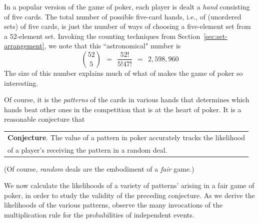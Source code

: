 \medskip


\noindent
In a popular version of the game of poker, each player is dealt a {\it hand} consisting of five cards.  The total number of possible five-card hands, i.e., of (unordered sets) of five cards, is just the number of ways of choosing a five-element set from a $52$-element set.  Invoking the counting techniques from Section~\ref{sec:set-arrangement}, we note that this ``astronomical" number is
\[ {52 \choose 5} \ \ = \ \ \frac{52!}{5! 47!} \ \ = \ \ 2,598,960  \]
The size of this number explains much of what of makes the game of poker so interesting.

\medskip

Of course, it is the {\em patterns} of the cards in various hands that determines which hands beat other ones in the competition that is at the heart of poker.  It is a reasonable conjecture that

\smallskip

{\em
\begin{tabular}{l}
{\bf Conjecture}.
The value of a pattern in poker accurately tracks the likelihood \\
of a player's receiving the pattern in a random deal.
\end{tabular}
}

\smallskip

\noindent
(Of course, {\em random} deals are the embodiment of a {\em fair} game.)

\bigskip

We now calculate the likelihoods of a variety of patterns' arising in a fair game of poker, in order to study the validity of the preceding conjecture.  As we derive the likelihoods of the various patterns, observe the many invocations of the multiplication rule for the probabilities of independent events.

\medskip

